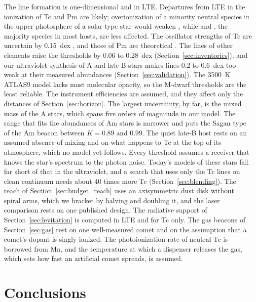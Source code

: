 \documentclass[final,5p]{elsarticle}
\begin{document}
The line formation is one-dimensional and in LTE. Departures from LTE in the ionization of Tc and Pm are likely; overionization of a minority neutral species in the upper photosphere of a solar-type star would weaken , while  and , the majority species in most hosts, are less affected. The oscillator strengths of Tc are uncertain by 0.15~dex \citep{Palmeri2005}, and those of Pm are theoretical \citep{Fivet2007}. The lines of other elements raise the thresholds by 0.06 to 0.28~dex (Section~\ref{sec:inventories}), and our ultraviolet synthesis of A and late-B stars makes  lines 0.2 to 0.6~dex too weak at their measured abundances (Section~\ref{sec:validation}). The 3500~K ATLAS9 model lacks most molecular opacity, so the M-dwarf thresholds are the least reliable. The instrument efficiencies are assumed, and they affect only the distances of Section~\ref{sec:horizon}. The largest uncertainty, by far, is the mixed mass of the A stars, which spans five orders of magnitude in our model. The range that fits the abundances of Am stars is narrower and puts the Sagan type of the Am beacon between $K = 0.89$ and 0.99. The quiet late-B host rests on an assumed absence of mixing and on what happens to Tc at the top of its atmosphere, which no model yet follows. Every threshold assumes a receiver that knows the star's spectrum to the photon noise. Today's models of these stars fall far short of that in the ultraviolet, and a search that uses only the Tc lines on clean continuum needs about 40 times more Tc (Section~\ref{sec:blending}). The reach of Section~\ref{sec:budget_reach} uses an axisymmetric dust disk without spiral arms, which we bracket by halving and doubling it, and the laser comparison rests on one published design. The radiative support of Section~\ref{sec:levitation} is computed in LTE and for Tc only. The gas beacons of Section~\ref{sec:gas} rest on one well-measured comet and on the assumption that a comet's dopant is singly ionized. The photoionization rate of neutral Tc is borrowed from Mn, and the temperature at which a dispenser releases the gas, which sets how fast an artificial comet spreads, is assumed.

\section{Conclusions}
\label{sec:conclusions}
\end{document}
